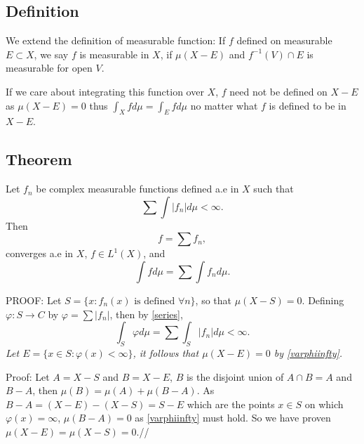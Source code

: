 \documentclass[oneside]{book}
\begin{document}
\subsection{Definition}
We extend the definition of measurable function: If $f$ defined on
measurable $E\subset X$, we say $f$ is measurable in $X$,
if $\mu(X-E)$ and $f^{-1}(V)\cap E$ is measurable
for open $V$.

If we care about integrating this function over $X$,
$f$ need not be defined on $X-E$ as $\mu(X-E)=0$ thus
$\int_X f d\mu = \int_E f d\mu$ no matter what $f$ is defined to
be in $X-E$.

\subsection{Theorem}
Let $f_n$ be complex measurable functions defined a.e
in $X$ such that
$$\sum \int |f_n| d\mu < \infty.$$
Then
$$f=\sum f_n,$$
converges a.e in $X$, $f\in L^1(X)$, and
$$\int f d\mu = \sum \int f_n d\mu.$$

PROOF: Let $S=\{x: f_n(x) \text{ is defined }\forall n\}$, so that
$\mu(X- S)=0$. Defining $\varphi:S\rightarrow C$ by
$\varphi = \sum |f_n|$, then by \ref{series},
\begin{equation}\label{varphiinfty}
    \int_S\varphi d\mu = \sum \int_S |f_n| d\mu < \infty.
\end{equation}
\emph{Let $E=\{x\in S:\varphi(x) < \infty\}$, it follows that
$\mu(X-E)=0$ by \ref{varphiinfty}.}

Proof: Let $A=X-S$ and $B=X-E$, $B$ is the disjoint union of
$A\cap B=A$ and $B-A$, then $\mu(B)=\mu(A)+\mu(B-A)$.
As $B-A=(X-E)-(X-S)=S-E$ which are the points $x\in S$ on which
$\varphi(x)=\infty$, $\mu(B-A)=0$ as \ref{varphiinfty} must hold.
So we have proven $\mu(X-E)=\mu(X-S)=0$.\hfill //
\end{document}
